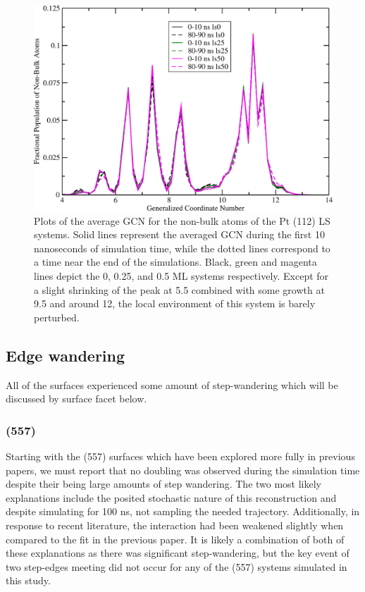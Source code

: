 \begin{figure}[p!]
  \includegraphics[width=\linewidth]{../figures/chap4/112ls_GCNF.pdf}
  \caption{Plots of the average GCN for the non-bulk atoms of the Pt (112) LS
systems. Solid lines represent the averaged GCN during the first 10 nanoseconds
of simulation time, while the dotted lines correspond to a time near the end of
the simulations. Black, green and magenta lines depict the 0, 0.25, and 0.5 ML
systems respectively. Except for a slight shrinking of the peak at 5.5 combined
with some growth at 9.5 and around 12, the local environment of this system is
barely perturbed.}
\label{fig:LS112GCNF}
\end{figure}

\subsection{Edge wandering}
All of the surfaces experienced some amount of step-wandering which will be
discussed by surface facet below.

\subsubsection{ (557)}
Starting with the (557) surfaces which have been explored more fully in
previous papers,\citep{Tao:2010aa, Michalka:2013aa} we must  report
that no doubling was observed during the simulation time despite their being
large amounts of step wandering. The two most likely explanations include the
posited stochastic nature of this reconstruction and despite simulating for
100 ns, not sampling the needed trajectory. Additionally, in response to
recent literature\citep{Deshlahra:2012aa}, the  interaction had
been weakened slightly when compared to the fit in the previous
paper.\citep{Michalka:2013aa} It is likely a combination of both of these
explanations as there was significant step-wandering, but the key event of two
step-edges meeting did not occur for any of the (557) systems simulated in this
study.

